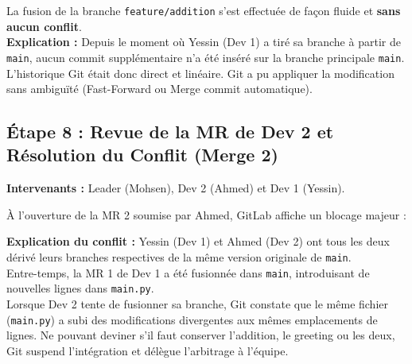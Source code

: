 \documentclass[a4paper,12pt]{article}
\begin{document}
\begin{tcolorbox}[colback=blue!5!white,colframe=primary,title=\textbf{Réponse à la Question : Interpréter le Merge 1}]
La fusion de la branche \texttt{feature/addition} s'est effectuée de façon fluide et \textbf{sans aucun conflit}.\\
\textbf{Explication :} Depuis le moment où Yessin (Dev 1) a tiré sa branche à partir de \texttt{main}, aucun commit supplémentaire n'a été inséré sur la branche principale \texttt{main}. L'historique Git était donc direct et linéaire. Git a pu appliquer la modification sans ambiguïté (Fast-Forward ou Merge commit automatique).
\end{tcolorbox}

\subsection{Étape 8 : Revue de la MR de Dev 2 et Résolution du Conflit (Merge 2)}
\textbf{Intervenants :} Leader (Mohsen), Dev 2 (Ahmed) et Dev 1 (Yessin).

À l'ouverture de la MR 2 soumise par Ahmed, GitLab affiche un blocage majeur :
\begin{center}
\textbf{\color{accent}}
\end{center}

\begin{tcolorbox}[colback=red!5!white,colframe=accent,title=\textbf{Réponse à la Question : Interpréter le Conflit}]
\textbf{Explication du conflit :} Yessin (Dev 1) et Ahmed (Dev 2) ont tous les deux dérivé leurs branches respectives de la même version originale de \texttt{main}.\\
Entre-temps, la MR 1 de Dev 1 a été fusionnée dans \texttt{main}, introduisant de nouvelles lignes dans \texttt{main.py}.\\
Lorsque Dev 2 tente de fusionner sa branche, Git constate que le même fichier (\texttt{main.py}) a subi des modifications divergentes aux mêmes emplacements de lignes. Ne pouvant deviner s'il faut conserver l'addition, le greeting ou les deux, Git suspend l'intégration et délègue l'arbitrage à l'équipe.
\end{tcolorbox}
\end{document}

